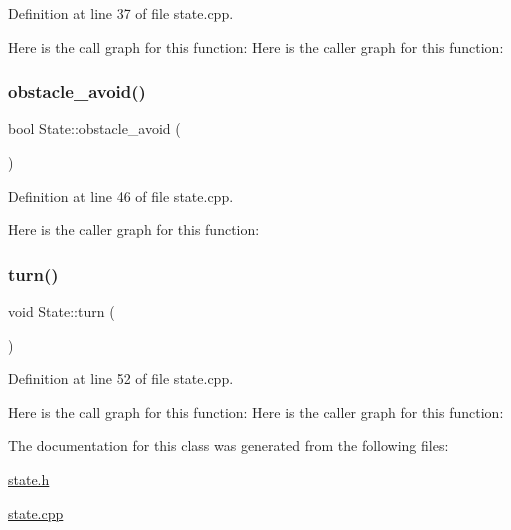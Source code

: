 Definition at line 37 of file state.\+cpp.

Here is the call graph for this function\+:
Here is the caller graph for this function\+:
\mbox{\label{class_state_a975afaa8e6091654888d7ed58b8c29c1}} 
\subsubsection{\texorpdfstring{obstacle\+\_\+avoid()}{obstacle\_avoid()}}
{\footnotesize\ttfamily bool State\+::obstacle\+\_\+avoid (\begin{DoxyParamCaption}{ }\end{DoxyParamCaption})}



Definition at line 46 of file state.\+cpp.

Here is the caller graph for this function\+:
\mbox{\label{class_state_ae5ed95e28512e11f7cc41c603ca58ad5}} 
\subsubsection{\texorpdfstring{turn()}{turn()}}
{\footnotesize\ttfamily void State\+::turn (\begin{DoxyParamCaption}{ }\end{DoxyParamCaption})}



Definition at line 52 of file state.\+cpp.

Here is the call graph for this function\+:
Here is the caller graph for this function\+:


The documentation for this class was generated from the following files\+:\begin{DoxyCompactItemize}
\item 
\mbox{\hyperlink{state_8h}{state.\+h}}\item 
\mbox{\hyperlink{state_8cpp}{state.\+cpp}}\end{DoxyCompactItemize}
